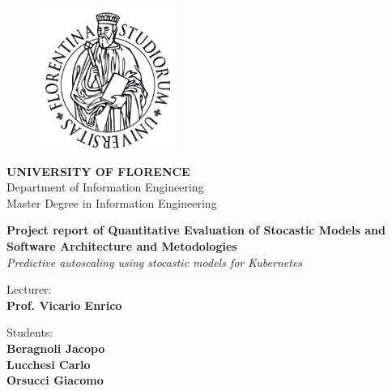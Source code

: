 \begin{titlepage}
\begin{figure}[!htb]
    \centering
    \includegraphics[keepaspectratio=true,width=0.4\textwidth]{images/Frontespizio/stemma.pdf}
\end{figure}

\begin{center}
    \LARGE{\bf UNIVERSITY OF FLORENCE}
    \vspace{5mm}
    \\ \large{Department of Information Engineering}
    \vspace{5mm}
    \\ \large{Master Degree in Information Engineering}
\end{center}

\vspace{12mm}
\begin{center}
    {\LARGE{\bf Project report of Quantitative Evaluation of Stocastic Models and Software Architecture and Metodologies}} \\
    {\large \textit{Predictive autoscaling using stocastic models for Kubernetes}}
    
\end{center}
\vspace{28mm}

\begin{minipage}[t]{0.47\textwidth}
	{\large{Lecturer:}{\normalsize\vspace{3mm}
	\bf\\ \large{Prof. Vicario Enrico} \normalsize\vspace{3mm}\bf }}
\end{minipage}
\hfill
\begin{minipage}[t]{0.47\textwidth}\raggedleft
	{\large{Students:}{\normalsize\vspace{3mm} \bf\\ \large{Beragnoli Jacopo}\normalsize\vspace{3mm} \\ \large{Lucchesi Carlo}\normalsize\vspace{3mm}\\ \large{Orsucci Giacomo} \normalsize\vspace{3mm} \negthickspace \!}}
\end{minipage}

\vspace{27mm}
\hrulefill
\\

\end{titlepage}